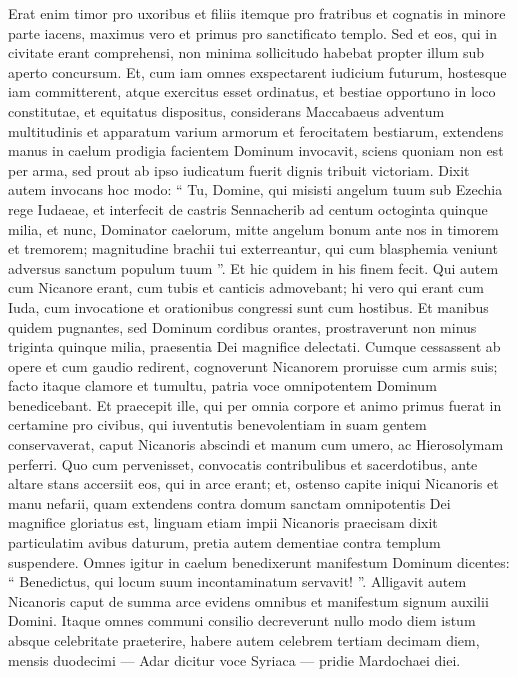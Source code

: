 \begin{biblechapter}
\begin{biblechapter}
\begin{biblechapter}
\begin{biblechapter}
\begin{biblechapter}
\begin{biblechapter}
\begin{biblechapter}
\begin{biblechapter}
\begin{biblechapter}
\begin{biblechapter}
\begin{biblechapter}
\begin{biblechapter}
\begin{biblechapter}
\begin{biblechapter}
\begin{biblechapter}
\verse Erat enim timor pro uxoribus et filiis itemque pro fratribus et cognatis in minore parte iacens, maximus vero et primus pro sanctificato templo. 
\verse Sed et eos, qui in civitate erant comprehensi, non minima sollicitudo habebat propter illum sub aperto concursum. 
\verse Et, cum iam omnes exspectarent iudicium futurum, hostesque iam committerent, atque exercitus esset ordinatus, et bestiae opportuno in loco constitutae, et equitatus dispositus, 
\verse considerans Maccabaeus adventum multitudinis et apparatum varium armorum et ferocitatem bestiarum, extendens manus in caelum prodigia facientem Dominum invocavit, sciens quoniam non est per arma, sed prout ab ipso iudicatum fuerit dignis tribuit victoriam. 
\verse Dixit autem invocans hoc modo: “ Tu, Domine, qui misisti angelum tuum sub Ezechia rege Iudaeae, et interfecit de castris Sennacherib ad centum octoginta quinque milia, 
 \verse et nunc, Dominator caelorum, mitte angelum bonum ante nos in timorem et tremorem; 
\verse magnitudine brachii tui exterreantur, qui cum blasphemia veniunt adversus sanctum populum tuum ”. Et hic quidem in his finem fecit.
 \verse Qui autem cum Nicanore erant, cum tubis et canticis admovebant; 
\verse hi vero qui erant cum Iuda, cum invocatione et orationibus congressi sunt cum hostibus. 
\verse Et manibus quidem pugnantes, sed Dominum cordibus orantes, prostraverunt non minus triginta quinque milia, praesentia Dei magnifice delectati. 
\verse Cumque cessassent ab opere et cum gaudio redirent, cognoverunt Nicanorem proruisse cum armis suis; 
\verse facto itaque clamore et tumultu, patria voce omnipotentem Dominum benedicebant. 
\verse Et praecepit ille, qui per omnia corpore et animo primus fuerat in certamine pro civibus, qui iuventutis benevolentiam in suam gentem conservaverat, caput Nicanoris abscindi et manum cum umero, ac Hierosolymam perferri. 
\verse Quo cum pervenisset, convocatis contribulibus et sacerdotibus, ante altare stans accersiit eos, qui in arce erant; 
\verse et, ostenso capite iniqui Nicanoris et manu nefarii, quam extendens contra domum sanctam omnipotentis Dei magnifice gloriatus est, 
\verse linguam etiam impii Nicanoris praecisam dixit particulatim avibus daturum, pretia autem dementiae contra templum suspendere.
 \verse Omnes igitur in caelum benedixerunt manifestum Dominum dicentes: “ Benedictus, qui locum suum incontaminatum servavit! ”. 
\verse Alligavit autem Nicanoris caput de summa arce evidens omnibus et manifestum signum auxilii Domini. 
\verse Itaque omnes communi consilio decreverunt nullo modo diem istum absque celebritate praeterire, habere autem celebrem tertiam decimam diem, mensis duodecimi — Adar dicitur voce Syriaca — pridie Mardochaei diei.

\end{biblechapter}
\end{biblechapter}
\end{biblechapter}
\end{biblechapter}
\end{biblechapter}
\end{biblechapter}
\end{biblechapter}
\end{biblechapter}
\end{biblechapter}
\end{biblechapter}
\end{biblechapter}
\end{biblechapter}
\end{biblechapter}
\end{biblechapter}
\end{biblechapter}
